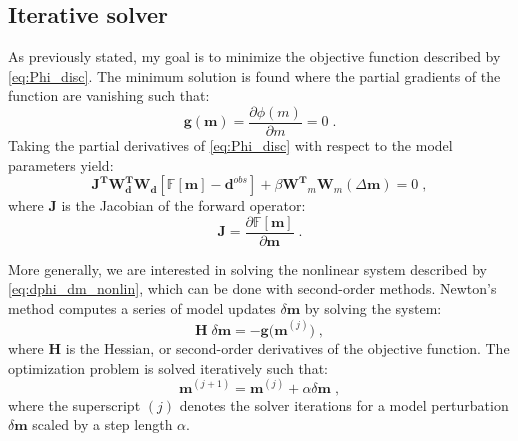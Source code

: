 \subsection{Iterative solver}\label{Iterative solver}
As previously stated, my goal is to minimize the objective function described by \ref{eq:Phi_disc}.
The minimum solution is found where the partial gradients of the function are vanishing such that:
\begin{equation}
\mathbf{g(m)} = \frac{\partial \phi(m)}{\partial m} = 0 \;.
\end{equation}
Taking the partial derivatives of \ref{eq:Phi_disc} with respect to the model parameters yield:
\begin{equation}\label{eq:dphi_dm_nonlin}
\mathbf{J^T W_\text{d}^T W_\text{d}} \left[ \mathbb{F}[\mathbf{m}] -\mathbf{d}^{obs} \right]+ \beta \mathbf{W^T}_m \mathbf{W}_m  \left( \Delta \mathbf{m} \right)=0  \;,
\end{equation}
where $\mathbf{J}$ is the Jacobian of the forward operator:
\begin{equation}
\mathbf{J} = \frac{\partial  \mathbb{F}[\mathbf{m}]}{\partial \mathbf{m}} \;.
\end{equation}

More generally, we are interested in solving the nonlinear system described by \ref{eq:dphi_dm_nonlin}, which can be done with second-order methods. 
Newton's method computes a series of model updates $\delta \mathbf{m}$ by solving the system:
\begin{equation}
\mathbf{H} \; \delta \mathbf{m} = -\mathbf{g(m}^{(j)}) \;,
\end{equation}
where $\mathbf{H}$ is the Hessian, or second-order derivatives of the objective function.
The optimization problem is solved iteratively such that:
\begin{equation}
\mathbf{m}^{(j+1)} = \mathbf{m}^{(j)} + \alpha \delta \mathbf{m} \;,
\end{equation}
where the superscript $(j)$ denotes the solver iterations for a model perturbation $\delta \mathbf{m}$ scaled by a step length $\alpha$.

